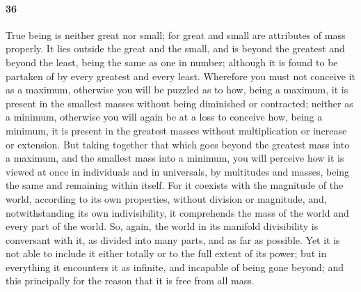 \documentclass[12pt]{article}
\begin{document}
\paragraph{36} True being is neither great nor small; for great and small are
attributes of mass properly. It lies outside the great and the small, and is
beyond the greatest and beyond the least, being the same as one in number;
although it is found to be partaken of by every greatest and every least.
Wherefore you must not conceive it as a maximum, otherwise you will be puzzled
as to how, being a maximum, it is present in the smallest masses without being
diminished or contracted; neither as a minimum, otherwise you will again be at
a loss to conceive how, being a minimum, it is present in the greatest masses
without multiplication or increase or extension. But taking together that which
goes beyond the greatest mass into a maximum, and the smallest mass into a
minimum, you will perceive how it is viewed at once in individuals and in
universals, by multitudes and masses, being the same and remaining within
itself. For it coexists with the magnitude of the world, according to its
own properties, without division or magnitude, and, notwithstanding its own
indivisibility, it comprehends the mass of the world and every part of the
world. So, again, the world in its manifold divisibility is conversant with it,
as divided into many parts, and as far as possible. Yet it is not able to
include it either totally or to the full extent of its power; but in everything
it encounters it as infinite, and incapable of being gone beyond; and this
principally for the reason that it is free from all mass.
\end{document}
